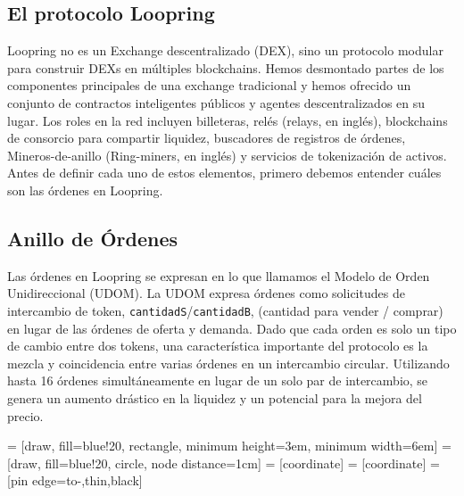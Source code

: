 \documentclass[UTF8,nofonts]{article}
\makeatletter
\newenvironment{figurehere}
 {\def\@captype{figure}}
 {}
\makeatother
\begin{document}
\begin{multicols}{2}
\section{El protocolo Loopring\label{sec:loopring_protocol}}
Loopring no es un Exchange descentralizado (DEX), sino un protocolo modular para construir DEXs en m\'ultiples blockchains. Hemos desmontado partes de los componentes principales de una exchange tradicional y hemos ofrecido un conjunto de contractos inteligentes p\'ublicos y agentes descentralizados en su lugar. Los roles en la red incluyen billeteras, rel\'es (relays, en ingl\'es), blockchains de consorcio para compartir liquidez, buscadores de registros de \'ordenes, Mineros-de-anillo (Ring-miners, en ingl\'es) y servicios de tokenizaci\'on de activos. Antes de definir cada uno de estos elementos, primero debemos entender cu\'ales son las \'ordenes en Loopring.

\subsection{Anillo de \'Ordenes \label{sec:order_ring}}
Las \'ordenes en Loopring se expresan en lo que llamamos el Modelo de Orden Unidireccional (UDOM)\cite{coinport2014udom}. La UDOM expresa \'ordenes como solicitudes de intercambio de token, \verb|cantidadS|/\verb|cantidadB|, (cantidad para vender / comprar) en lugar de las \'ordenes de oferta y demanda. Dado que cada orden es solo un tipo de cambio entre dos tokens, una caracter\'istica importante del protocolo es la mezcla y coincidencia entre varias \'ordenes en un intercambio circular. Utilizando hasta 16 \'ordenes simult\'aneamente en lugar de un solo par de intercambio, se genera un aumento dr\'astico en la liquidez y un potencial para la mejora del precio.

\begin{center}
\begin{figurehere}
\centering
{} = [draw, fill=blue!20, rectangle, 
    minimum height=3em, minimum width=6em]
 = [draw, fill=blue!20, circle, node distance=1cm]
 = [coordinate]
 = [coordinate]
 = [pin edge={to-,thin,black}]

\begin{tikzpicture}[
    auto, 
    node distance=2cm,
    >=latex',
    font=\bfseries\footnotesize\sffamily,
    order/.style={
		scale=0.7,
		rectangle,
		rounded corners,
		draw=black, 
		text centered,
		minimum height=12mm,
		fill=white
	},
	label/.style={
		scale=0.7
	}
  ]


\end{tikzpicture}
\end{figurehere}
\end{center}
\end{multicols}
\end{document}
